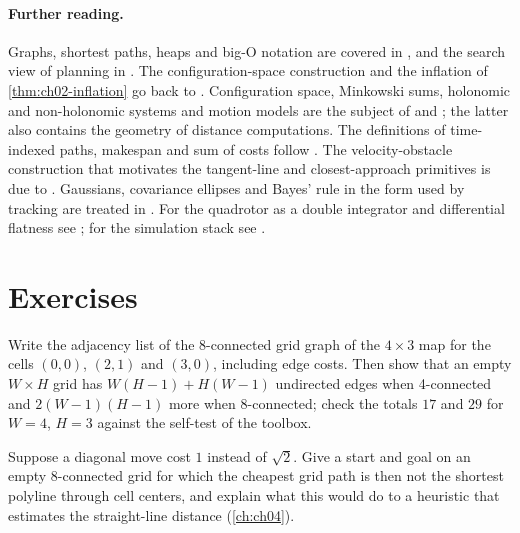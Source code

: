 \paragraph{Further reading.}
Graphs, shortest paths, heaps and big-O notation are covered in \textcite{cormen2009clrs}, and the search view of planning in \textcite{russell2020aima}. The configuration-space construction and the inflation of \cref{thm:ch02-inflation} go back to \textcite{lozanoperez1983spatial}. Configuration space, Minkowski sums, holonomic and non-holonomic systems and motion models are the subject of \textcite{lavalle2006planning} and \textcite{choset2005principles}; the latter also contains the geometry of distance computations. The definitions of time-indexed paths, makespan and sum of costs follow \textcite{stern2019mapf}. The velocity-obstacle construction that motivates the tangent-line and closest-approach primitives is due to \textcite{fiorini1998motion}. Gaussians, covariance ellipses and Bayes' rule in the form used by tracking are treated in \textcite{thrun2005probabilistic}. For the quadrotor as a double integrator and differential flatness see \textcite{mellinger2011minimum}; for the simulation stack see \textcite{panerati2021learning}.

\section{Exercises}
\label{sec:ch02-exercises}

\begin{exercise}[\difficulty{1}]
\label{exr:ch02-adjacency}
Write the adjacency list of the 8-connected grid graph of the $4\times3$ map \code{["....", ".\#..", "...."]} for the cells $(0,0)$, $(2,1)$ and $(3,0)$, including edge costs. Then show that an empty $W\times H$ grid has $W(H-1)+H(W-1)$ undirected edges when 4-connected and $2(W-1)(H-1)$ more when 8-connected; check the totals $17$ and $29$ for $W=4$, $H=3$ against the self-test of the toolbox.
\end{exercise}

\begin{exercise}[\difficulty{1}]
\label{exr:ch02-diagonal-cost}
Suppose a diagonal move cost $1$ instead of $\sqrt2$. Give a start and goal on an empty 8-connected grid for which the cheapest grid path is then not the shortest polyline through cell centers, and explain what this would do to a heuristic that estimates the straight-line distance (\cref{ch:ch04}).
\end{exercise}

